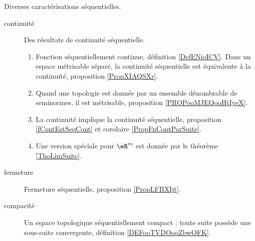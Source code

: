 	\label{THEMEooCaractSuites}
Diverses caractérisations séquentielles.
\begin{description}
	\item[continuité]
		Des résultats de continuité séquentielle.
		\begin{enumerate}
			\item
			      Fonction séquentiellement continue, définition \ref{DefENioICV}. Dans un espace métrisable séparé, la continuité séquentielle est équivalente à la continuité, proposition \ref{PropXIAQSXr}.
			\item
			      Quand une topologie est donnée par un ensemble dénombrable de seminormes, il est métrisable, proposition \ref{PROPooMJEQooHtIyeX}.
			\item
			      La continuité implique la continuité séquentielle, proposition \ref{fContEstSeqCont} et corolaire \ref{PropFnContParSuite}.
			\item
			      Une version spéciale pour \( \eR^m\) est donnée par le théorème \ref{ThoLimSuite}.
		\end{enumerate}
	\item[fermeture]
		Fermeture séquentielle, proposition \ref{PropLFBXIjt}.
	\item[compacité]
		Un espace topologique séquentiellement compact : toute suite possède une sous-suite convergente, définition \ref{DEFooTVDOooZbwOFK}.
\end{description}
